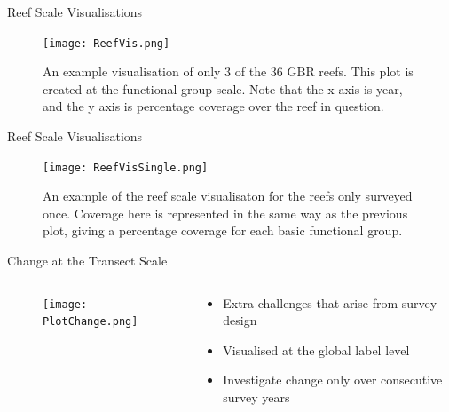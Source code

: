 \documentclass{beamer}
\begin{document}
              \begin{frame}{Reef Scale Visualisations}
                \begin{figure}
                    \centering
                    \texttt{[image: ReefVis.png]}
                    \caption{An example visualisation of only 3 of the 36 GBR reefs. This plot is created at the functional group scale. Note that the x axis is year, and the y axis is percentage coverage over the reef in question. }
                \end{figure}
             \end{frame}

             \begin{frame}{Reef Scale Visualisations}
                \begin{figure}
                    \centering
                    \texttt{[image: ReefVisSingle.png]}
                    \caption{An example of the reef scale visualisaton for the reefs only surveyed once. Coverage here is represented in the same way as the previous plot, giving a percentage coverage for each basic functional group.}
                \end{figure}
             \end{frame}


             \begin{frame}{Change at the Transect Scale}
               \begin{columns}[T]
                 \begin{column}{0.48\textwidth}
                   \centering
                    \begin{figure}
                        \centering
                        \texttt{[image: PlotChange.png]}
                   \end{figure}
                 \end{column}
                 \begin{column}{0.48\textwidth}
                   \centering
                    \begin{itemize}
                      \item Extra challenges that arise from survey design
                      \item Visualised at the global label level
                      \item Investigate change only over consecutive survey years
                    \end{itemize}
                 \end{column}
              \end{columns}
             \end{frame}
\end{document}

